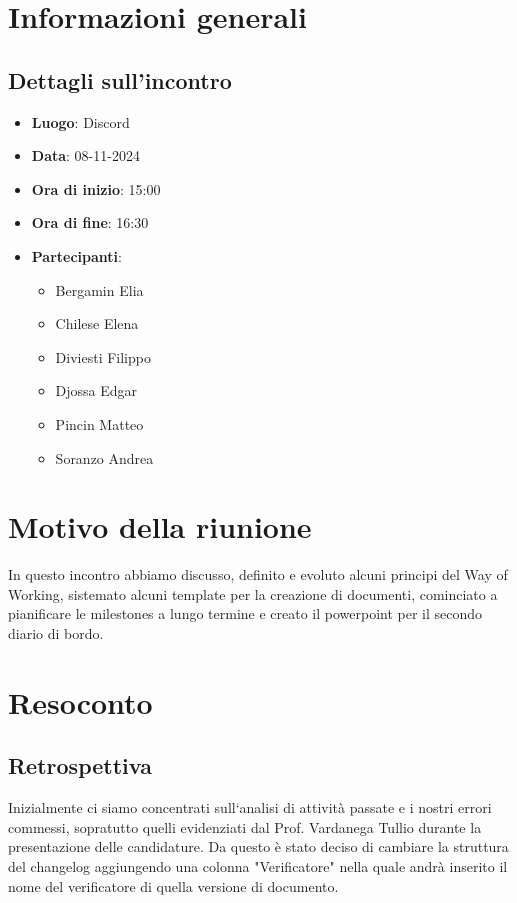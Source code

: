\section{Informazioni generali}
\subsection{Dettagli sull'incontro}
\begin{itemize}
    \item \textbf{Luogo}: Discord
    \item \textbf{Data}: 08-11-2024
    \item \textbf{Ora di inizio}: 15:00
    \item \textbf{Ora di fine}: 16:30
    \item \textbf{Partecipanti}: 
    \begin{itemize}
        \item Bergamin Elia
        \item Chilese Elena
        \item Diviesti Filippo
        \item Djossa Edgar
        \item Pincin Matteo 
        \item Soranzo Andrea  
    \end{itemize}
\end{itemize}

\section{Motivo della riunione}
In questo incontro abbiamo discusso, definito e evoluto alcuni principi del Way of Working, sistemato alcuni template per la creazione di documenti,
cominciato a pianificare le milestones a lungo termine e creato il powerpoint per il secondo diario di bordo.

\section{Resoconto}
\subsection{Retrospettiva}
Inizialmente ci siamo concentrati sull`analisi di attività passate e i nostri errori commessi, sopratutto quelli evidenziati dal Prof. Vardanega Tullio durante la presentazione
delle candidature. Da questo è stato deciso di cambiare la struttura del changelog aggiungendo una colonna "Verificatore" nella quale andrà inserito il nome del verificatore di quella versione di documento.

